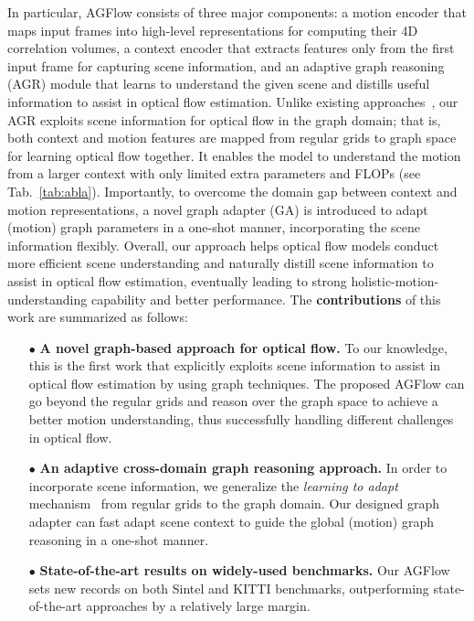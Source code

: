\documentclass[letterpaper]{article} %
\begin{document}
In particular, AGFlow consists of three major components: a motion encoder that maps input frames into high-level representations for computing their 4D correlation volumes, a context encoder that extracts features only from the first input frame for capturing scene information, and an adaptive graph reasoning (AGR) module that learns to understand the given scene and distills useful information to assist in optical flow estimation. Unlike existing approaches~\cite{Teed2020RAFTRA,Jiang2021LearningOF}, our AGR exploits scene information for optical flow in the graph domain; that is, both context and motion features are mapped from regular grids to graph space for learning optical flow together. It enables the model to understand the motion from a larger context with only limited extra parameters and FLOPs (see Tab.~\ref{tab:abla}). Importantly, to overcome the domain gap between context and motion representations, a novel graph adapter (GA) is introduced to adapt (motion) graph parameters in a one-shot manner, incorporating the scene information flexibly.  Overall, our approach helps optical flow models conduct more efficient scene understanding and naturally distill scene information to assist in optical flow estimation, eventually leading to strong holistic-motion-understanding capability and better performance.  The {\bfseries contributions} of this work are summarized as follows:
\begin{itemize}
\item[$\bullet$]
{\bfseries A novel graph-based approach for optical flow.} To our knowledge, this is the first work that explicitly exploits scene information to assist in optical flow estimation by using graph techniques. The proposed AGFlow can go beyond the regular grids and reason over the graph space to achieve a better motion understanding, thus successfully handling different challenges in optical flow.

\item[$\bullet$]
{\bfseries An adaptive cross-domain graph reasoning approach.} In order to incorporate scene information, we generalize the \emph{learning to adapt} mechanism~\cite{Bertinetto2016LearningFO} from regular grids to the graph domain. Our designed graph adapter can fast adapt scene context to guide the global (motion) graph reasoning in a one-shot manner.

\item[$\bullet$]
{\bfseries State-of-the-art results on widely-used benchmarks.} Our AGFlow sets new records on both Sintel and KITTI benchmarks, outperforming state-of-the-art approaches by a relatively large margin.
\end{itemize}
\end{document}
